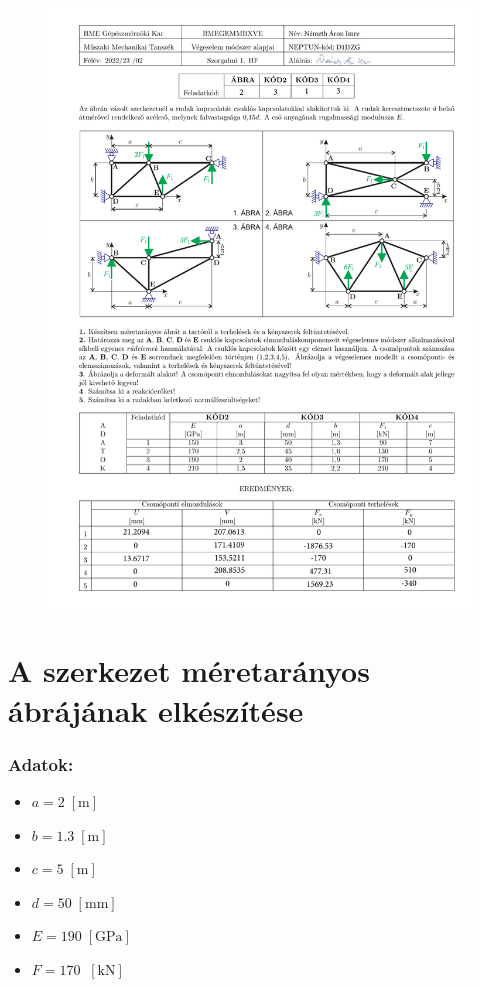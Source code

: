 \documentclass[12pt,a4paper]{article}
\def\m{\; \left[\mathrm{m}\right]}
\def\kN{\; \left[\mathrm{kN}\right]}
\begin{document}
\begin{figure}[H]
    \centering
    \includegraphics[width=1\textwidth]{szhf1_fedo.pdf}
\end{figure}

\section{A szerkezet méretarányos ábrájának elkészítése}
\subsubsection*{Adatok:}
\begin{multicols}{2}
    \begin{itemize}
        \item $a=2 \m$
        \item $b=1.3 \m$
        \item $c=5 \m$
    \end{itemize}
    \columnbreak
    \begin{itemize}
        \item $d=50 \; \left[\mathrm{mm}\right]$
        \item $E=190 \; \left[\mathrm{GPa}\right]$
        \item $F=170 \; \kN$
    \end{itemize}
\end{multicols}
\end{document}
